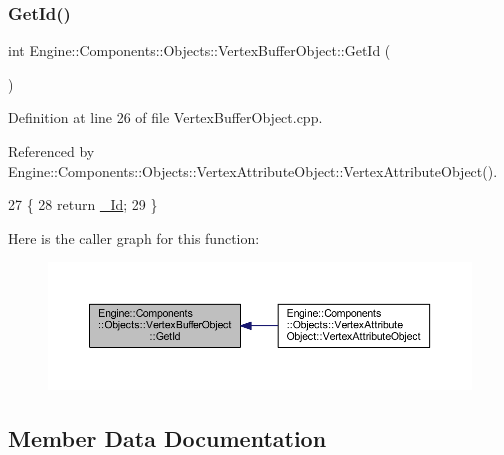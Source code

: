 \subsubsection{\texorpdfstring{Get\+Id()}{GetId()}}
{\footnotesize\ttfamily int Engine\+::\+Components\+::\+Objects\+::\+Vertex\+Buffer\+Object\+::\+Get\+Id (\begin{DoxyParamCaption}{ }\end{DoxyParamCaption})}



Definition at line 26 of file Vertex\+Buffer\+Object.\+cpp.



Referenced by Engine\+::\+Components\+::\+Objects\+::\+Vertex\+Attribute\+Object\+::\+Vertex\+Attribute\+Object().


\begin{DoxyCode}
27 \{
28     \textcolor{keywordflow}{return} \mbox{\hyperlink{classEngine_1_1Components_1_1Objects_1_1VertexBufferObject_a07adfeae7d3b23285d49b8005437ed77}{\_Id}};
29 \}
\end{DoxyCode}
Here is the caller graph for this function\+:
\nopagebreak
\begin{figure}[H]
\begin{center}
\leavevmode
\includegraphics[width=350pt]{classEngine_1_1Components_1_1Objects_1_1VertexBufferObject_ada22635c60245448346653b0e82f5d9c_icgraph}
\end{center}
\end{figure}


\subsection{Member Data Documentation}
\mbox{\label{classEngine_1_1Components_1_1Objects_1_1VertexBufferObject_a07adfeae7d3b23285d49b8005437ed77}} 
